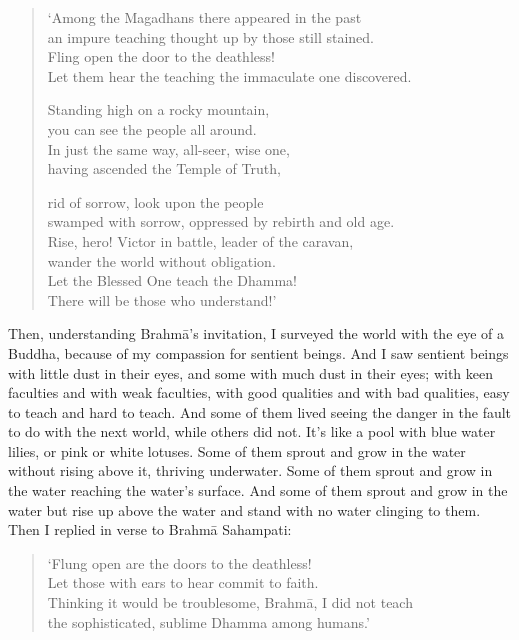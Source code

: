 \documentclass[12pt,openany]{book}%
\begin{document}
\begin{verse}%
‘Among the Magadhans there appeared in the past \\
an impure teaching thought up by those still stained. \\
Fling open the door to the deathless! \\
Let them hear the teaching the immaculate one discovered. 

Standing high on a rocky mountain, \\
you can see the people all around. \\
In just the same way, all-seer, wise one, \\
having ascended the Temple of Truth, 

rid of sorrow, look upon the people \\
swamped with sorrow, oppressed by rebirth and old age. \\
Rise, hero! Victor in battle, leader of the caravan, \\
wander the world without obligation. \\
Let the Blessed One teach the Dhamma! \\
There will be those who understand!’ 

%
\end{verse}

Then, understanding \textsanskrit{Brahmā}’s invitation, I surveyed the world with the eye of a Buddha, because of my compassion for sentient beings. And I saw sentient beings with little dust in their eyes, and some with much dust in their eyes; with keen faculties and with weak faculties, with good qualities and with bad qualities, easy to teach and hard to teach. And some of them lived seeing the danger in the fault to do with the next world, while others did not. It’s like a pool with blue water lilies, or pink or white lotuses. Some of them sprout and grow in the water without rising above it, thriving underwater. Some of them sprout and grow in the water reaching the water’s surface. And some of them sprout and grow in the water but rise up above the water and stand with no water clinging to them. Then I replied in verse to \textsanskrit{Brahmā} Sahampati: 

\begin{verse}%
‘Flung open are the doors to the deathless! \\
Let those with ears to hear commit to faith. \\
Thinking it would be troublesome, \textsanskrit{Brahmā}, I did not teach \\
the sophisticated, sublime Dhamma among humans.’ 

%
\end{verse}
\end{document}
